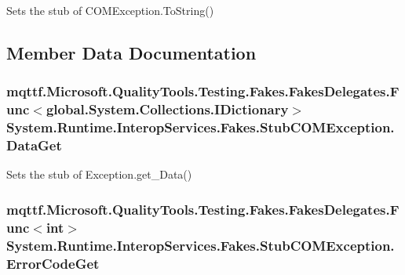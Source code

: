 Sets the stub of C\-O\-M\-Exception.\-To\-String()



\subsection{Member Data Documentation}
\hypertarget{class_system_1_1_runtime_1_1_interop_services_1_1_fakes_1_1_stub_c_o_m_exception_ac30b599985928de529c2172df862789b}{
\subsubsection[{Data\-Get}]{\setlength{\rightskip}{0pt plus 5cm}mqttf.\-Microsoft.\-Quality\-Tools.\-Testing.\-Fakes.\-Fakes\-Delegates.\-Func$<$global.\-System.\-Collections.\-I\-Dictionary$>$ System.\-Runtime.\-Interop\-Services.\-Fakes.\-Stub\-C\-O\-M\-Exception.\-Data\-Get}}\label{class_system_1_1_runtime_1_1_interop_services_1_1_fakes_1_1_stub_c_o_m_exception_ac30b599985928de529c2172df862789b}


Sets the stub of Exception.\-get\-\_\-\-Data()

\hypertarget{class_system_1_1_runtime_1_1_interop_services_1_1_fakes_1_1_stub_c_o_m_exception_a94d30ce3c25a2a3947cd6e842fe02b93}{
\subsubsection[{Error\-Code\-Get}]{\setlength{\rightskip}{0pt plus 5cm}mqttf.\-Microsoft.\-Quality\-Tools.\-Testing.\-Fakes.\-Fakes\-Delegates.\-Func$<$int$>$ System.\-Runtime.\-Interop\-Services.\-Fakes.\-Stub\-C\-O\-M\-Exception.\-Error\-Code\-Get}}\label{class_system_1_1_runtime_1_1_interop_services_1_1_fakes_1_1_stub_c_o_m_exception_a94d30ce3c25a2a3947cd6e842fe02b93}


